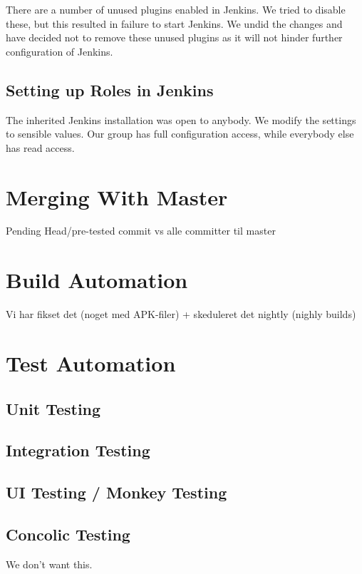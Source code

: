 There are a number of unused plugins enabled in Jenkins. We tried to disable these, but this resulted in failure to start Jenkins. We undid the changes and have decided not to remove these unused plugins as it will not hinder further configuration of Jenkins.

\subsection{Setting up Roles in Jenkins}
The inherited Jenkins installation was open to anybody. We modify the settings to sensible values. Our group has full configuration access, while everybody else has read access.

\section{Merging With Master}\label{sec:branching_strategy}
Pending Head/pre-tested commit vs alle committer til master

\section{Build Automation}\label{sec:build_automation}
Vi har fikset det (noget med APK-filer) + skeduleret det nightly (nighly builds)

\section{Test Automation}\label{sec:test_automation}
\subsection{Unit Testing}
\subsection{Integration Testing}
\subsection{UI Testing / Monkey Testing}
\subsection{Concolic Testing}
We don't want this.

